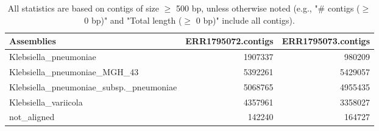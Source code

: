 \documentclass[12pt,a4paper]{article}
\begin{document}
\begin{table}[ht]
\begin{center}
\caption{All statistics are based on contigs of size $\geq$ 500 bp, unless otherwise noted (e.g., "\# contigs ($\geq$ 0 bp)" and "Total length ($\geq$ 0 bp)" include all contigs).}
\begin{tabular}{|l*{2}{|r}|}
\hline
Assemblies & ERR1795072.contigs & ERR1795073.contigs \\ \hline
Klebsiella\_pneumoniae & 1907337 & 980209 \\ \hline
Klebsiella\_pneumoniae\_MGH\_43 & 5392261 & 5429057 \\ \hline
Klebsiella\_pneumoniae\_subsp.\_pneumoniae & 5068765 & 4955435 \\ \hline
Klebsiella\_variicola & 4357961 & 3358027 \\ \hline
not\_aligned & 142240 & 164727 \\ \hline
\end{tabular}
\end{center}
\end{table}
\end{document}
